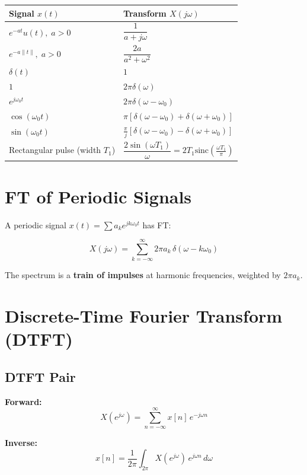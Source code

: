 \documentclass[11pt]{article}
\begin{document}
\begin{center}
\begin{tabular}{|l|l|}
\hline
\textbf{Signal $x(t)$} & \textbf{Transform $X(j\omega)$} \\
\hline
$e^{-at}u(t), \; a > 0$ & $\dfrac{1}{a + j\omega}$ \\
\hline
$e^{-a\|t\|}, \; a > 0$ & $\dfrac{2a}{a^2 + \omega^2}$ \\
\hline
$\delta(t)$ & $1$ \\
\hline
$1$ & $2\pi\delta(\omega)$ \\
\hline
$e^{j\omega_0 t}$ & $2\pi\delta(\omega - \omega_0)$ \\
\hline
$\cos(\omega_0 t)$ & $\pi[\delta(\omega - \omega_0) + \delta(\omega + \omega_0)]$ \\
\hline
$\sin(\omega_0 t)$ & $\frac{\pi}{j}[\delta(\omega - \omega_0) - \delta(\omega + \omega_0)]$ \\
\hline
Rectangular pulse (width $T_1$) & $\dfrac{2\sin(\omega T_1)}{\omega} = 2T_1 \text{sinc}\left(\frac{\omega T_1}{\pi}\right)$ \\
\hline
\end{tabular}
\end{center}

\section*{FT of Periodic Signals}

A periodic signal $x(t) = \sum a_k e^{jk\omega_0 t}$ has FT:

\[X(j\omega) = \sum_{k=-\infty}^{\infty} 2\pi a_k \, \delta(\omega - k\omega_0)\]

The spectrum is a \textbf{train of impulses} at harmonic frequencies, weighted by $2\pi a_k$.

\section*{Discrete-Time Fourier Transform (DTFT)}

\subsection*{DTFT Pair}

\textbf{Forward:}
\[X(e^{j\omega}) = \sum_{n=-\infty}^{\infty} x[n] \, e^{-j\omega n}\]

\textbf{Inverse:}
\[x[n] = \frac{1}{2\pi} \int_{2\pi} X(e^{j\omega}) \, e^{j\omega n} \, d\omega\]
\end{document}
